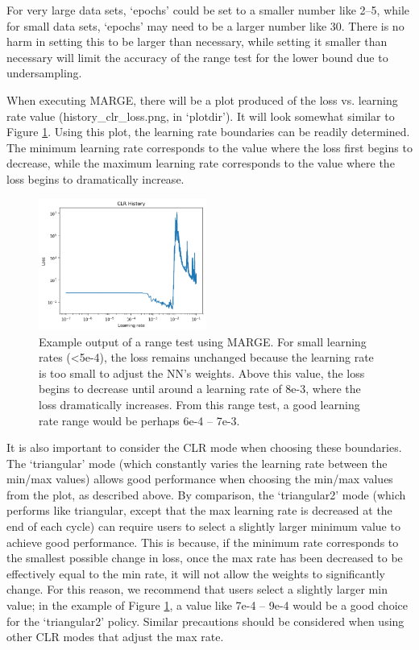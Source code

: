 \documentclass[letterpaper, 12pt]{article}
\begin{document}
\noindent For very large data sets, `epochs' could be set to a smaller number like 2--5, 
while for small data sets, `epochs' may need to be a larger number like 30.  
There is no harm in setting this to be larger than necessary, while setting it 
smaller than necessary will limit the accuracy of the range test for the lower 
bound due to undersampling. \newline

\noindent When executing MARGE, there will be a plot produced of the loss vs. 
learning rate value (history\_clr\_loss.png, in `plotdir').  It will look somewhat similar 
to Figure \ref{fig:rangetest}.  Using this plot, the learning rate boundaries can be 
readily determined.  The minimum learning rate corresponds to the value where 
the loss first begins to decrease, while the maximum learning rate corresponds 
to the value where the loss begins to dramatically increase.\newline

\begin{figure}[h]
\centering
\includegraphics[width=0.49\textwidth, clip]{range_test.png}
\caption{Example output of a range test using MARGE.  For small learning rates 
(\textless 5e-4), the loss remains unchanged because the learning rate is too 
small to adjust the NN's weights.  Above this value, the loss begins to decrease
until around a learning rate of 8e-3, where the loss dramatically increases. 
From this range test, a good learning rate range would be perhaps 6e-4 -- 
7e-3.}  
\label{fig:rangetest}
\end{figure}

\noindent It is also important to consider the CLR mode when choosing these 
boundaries.  The `triangular' mode (which constantly varies the 
learning rate between the min/max values) allows good performance when choosing 
the min/max values from the plot, as described above.  By comparison, the 
`triangular2' mode (which performs like triangular, except that the max 
learning rate is decreased at the end of each cycle) can require users to 
select a slightly larger minimum value to achieve good performance.  This is 
because, if the minimum rate corresponds to the smallest possible change in 
loss, once the max rate has been decreased to be effectively equal to the min 
rate, it will not allow the weights to significantly change.  For this reason, 
we recommend that users select a slightly larger min value; in the example of 
Figure \ref{fig:rangetest}, a value like 7e-4 -- 9e-4 would be a good choice 
for the `triangular2' policy.  Similar precautions should be considered when 
using other CLR modes that adjust the max rate. \newline
\end{document}
